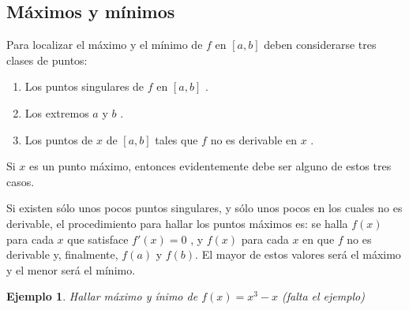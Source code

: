 \documentclass[12pt,a4paper]{extarticle}
\newtheorem{ejs}{Ejemplo}[section]
\begin{document}
\subsection{M\'aximos y m\'inimos}
Para localizar el m\'aximo y el m\'inimo de \( f \) en \( [a,b] \)  deben considerarse
tres clases de puntos:

\begin{enumerate}
\item Los puntos singulares de \( f \) en \( [a,b] \) .
\item Los extremos \( a \) y \( b \) .
\item Los puntos de \( x \)  de \( [a,b] \)  tales que \( f \) no es
  derivable en \( x \) .
\end{enumerate}

Si \( x \) es un punto m\'aximo, entonces evidentemente debe ser
alguno de estos tres casos.

Si existen s\'olo unos pocos puntos singulares, y s\'olo unos pocos en
los cuales no es derivable, el procedimiento para hallar los puntos
m\'aximos es: se halla \( f(x) \) para cada \( x \) que satisface \(
f'(x)=0 \) , y \( f(x) \) para cada \( x \) en que \( f \) no es
derivable y, finalmente, \( f(a) \) y \( f(b) \). El mayor de estos
valores ser\'a el m\'aximo y el menor ser\'a el m\'inimo.

\begin{ejs}{Hallar m\'aximo y \'inimo de \( f(x)=x^3-x \)}
(falta el ejemplo)
\end{ejs}
\end{document}
